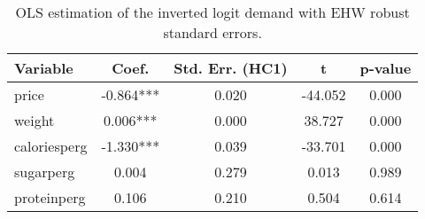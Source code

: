\begin{table}[H]
\caption{OLS estimation of the inverted logit demand with EHW robust standard errors.}
\label{tab:q3_ols_ehw}
\begin{tabular}{lcccc}
\toprule
Variable & Coef. & Std. Err. (HC1) & t & p-value \\
\midrule
price & -0.864*** & 0.020 & -44.052 & 0.000 \\
weight & 0.006*** & 0.000 & 38.727 & 0.000 \\
caloriesperg & -1.330*** & 0.039 & -33.701 & 0.000 \\
sugarperg & 0.004 & 0.279 & 0.013 & 0.989 \\
proteinperg & 0.106 & 0.210 & 0.504 & 0.614 \\
\bottomrule
\end{tabular}
\end{table}

